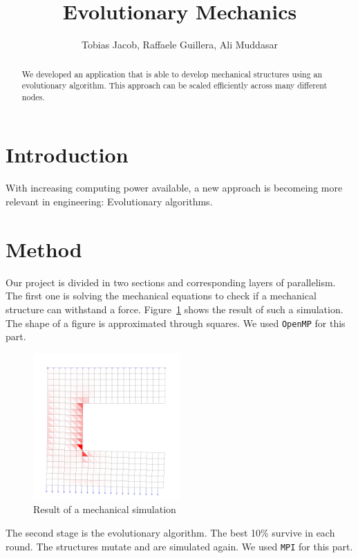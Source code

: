 \documentclass[12pt]{article}
\title{Evolutionary Mechanics}
\author{Tobias Jacob, Raffaele Guillera, Ali Muddasar}
\begin{document}
\maketitle

\begin{abstract}
    We developed an application that is able to develop mechanical structures using an evolutionary algorithm. This approach can be scaled efficiently across many different nodes.
\end{abstract}

\section{Introduction}

With increasing computing power available, a new approach is becomeing more relevant in engineering: Evolutionary algorithms.

\section{Method}

Our project is divided in two sections and corresponding layers of parallelism. The first one is solving the mechanical equations to check if a mechanical structure can withstand a force. Figure~\ref{fig:Mechanical_Simulation} shows the result of such a simulation. The shape of a figure is approximated through squares. We used \texttt{OpenMP} for this part.

\begin{figure}[h]
    \centering
    \includegraphics[width=0.5\textwidth, trim={0pt 0pt 0pt 5em}, clip]{images/MechaincalStructure.png}
    \caption{Result of a mechanical simulation}
    \label{fig:Mechanical_Simulation}
\end{figure}


The second stage is the evolutionary algorithm. The best 10\% survive in each round. The structures mutate and are simulated again. We used \texttt{MPI} for this part.
\end{document}
